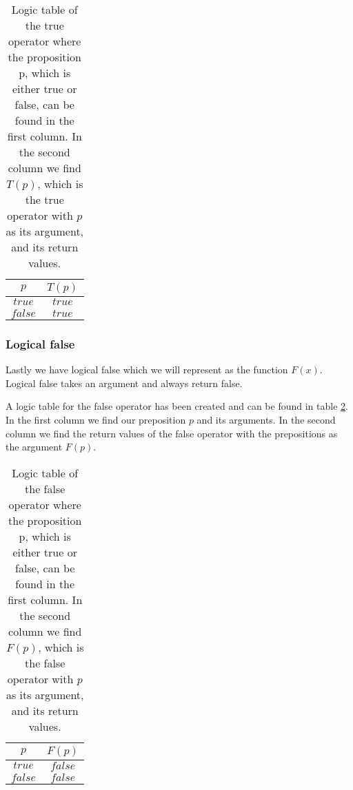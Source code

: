                 \begin{table}[h!]
                    \centering
                    \begin{tabular}{|c|c|}
                    	\hline
                    	  $p$   & $T(p)$ \\ \hline
                    	$true$  & $true$ \\ \hline
                    	$false$ & $true$ \\ \hline
                    \end{tabular}
                    \caption{Logic table of the true operator where the proposition p, which is either true or false, can be found in the first column. In the second column we find $T(p)$, which is the true operator with $p$ as its argument, and its return values.}
                    \label{LogicTable:True}
                \end{table}
        
            \subsubsection{Logical false}
        
                Lastly we have logical false which we will represent as the function $F(x)$. Logical false takes an argument and always return false.
                
                A logic table for the false operator has been created and can be found in table \ref{LogicTable:False}. In the first column we find our preposition $p$ and its arguments. In the second column we find the return values of the false operator with the prepositions as the argument $F(p)$.
                
                \begin{table}[h!]
                    \centering
                    \begin{tabular}{|c|c|}
                    	\hline
                    	  $p$   & $F(p)$  \\ \hline
                    	$true$  & $false$ \\ \hline
                    	$false$ & $false$ \\ \hline
                    \end{tabular}
                    \caption{Logic table of the false operator where the proposition p, which is either true or false, can be found in the first column. In the second column we find $F(p)$, which is the false operator with $p$ as its argument, and its return values.}
                    \label{LogicTable:False}
                \end{table} 
    
